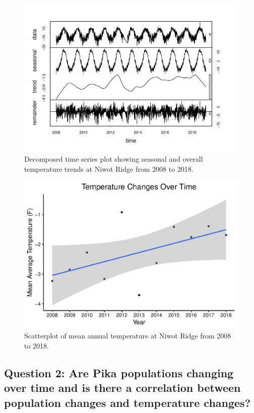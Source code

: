 \documentclass[
  12pt,
]{article}
\begin{document}
\begin{figure}
\centering
\includegraphics{FreedmanDye_ENV872_Project_files/figure-latex/unnamed-chunk-4-1.pdf}
\caption{Decomposed time series plot showing seasonal and overall
temperature trends at Niwot Ridge from 2008 to 2018.}
\end{figure}

\begin{figure}
\centering
\includegraphics{FreedmanDye_ENV872_Project_files/figure-latex/unnamed-chunk-5-1.pdf}
\caption{Scatterplot of mean annual temperature at Niwot Ridge from 2008
to 2018.}
\end{figure}

\hypertarget{question-2-are-pika-populations-changing-over-time-and-is-there-a-correlation-between-population-changes-and-temperature-changes}{%
\subsection{Question 2: Are Pika populations changing over time and is
there a correlation between population changes and temperature
changes?}\label{question-2-are-pika-populations-changing-over-time-and-is-there-a-correlation-between-population-changes-and-temperature-changes}}
\end{document}
